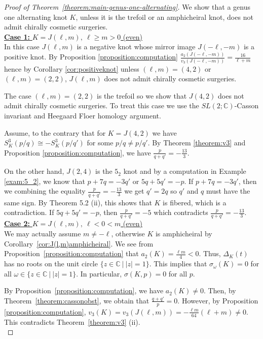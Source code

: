 \documentclass{amsart}
\theoremstyle{remark}
\theoremstyle{definition}
\begin{document}
\begin{proof}[{Proof of Theorem~\ref{theorem:main-genus-one-alternating}}]
We show that a genus one alternating knot $K$, unless it is the trefoil or an amphicheiral knot, does not admit chirally cosmetic surgeries. \\


\underline{\textbf{Case 1:} $K=J(\ell,m), \ \ell \geq m>0$ (even)}\\

In this case $J(\ell,m)$ is a negative knot whose mirror image $J(-\ell,-m)$ is a positive knot. 
By Proposition \ref{proposition:computation} $\frac{a_{2}(J(-\ell,-m))}{v_3(J(-\ell,-m))}= \frac{16}{\ell+m}$ hence by Corollary \ref{cor:positiveknot} unless $(\ell,m)=(4,2)$ or $(\ell,m)=(2,2)$, $J(\ell,m)$ does not admit chirally cosmetic surgeries.

 The case $(\ell,m)=(2,2)$ is the trefoil so we show that $J(4,2)$ does not admit chirally cosmetic surgeries. To treat this case we use the $SL(2;\mathbb{C})$-Casson invariant and Heegaard Floer homology argument.

Assume, to the contrary that for $K=J(4,2)$ we have $S^{3}_K(p/q)\cong -S^{3}_K(p/q')$ for some $p/q\neq p/q'$. By Theorem \ref{theorem:v3} and Proposition \ref{proposition:computation}, we have $\frac{p}{q+q'}=-\frac{13}{3}$.

On the other hand, $J(2,4)$ is the $5_2$ knot and by a computation in Example \ref{exam:5_2}, we know that $p+7q=-3q'$ or $5q+5q'=-p$. If $p+7q=-3q'$, then we combining the equality $\frac{p}{q+q'}=-\frac{13}{3}$ we get $q'=2q$ so $q'$ and $q$ must have the same sign. By Theorem 5.2 (ii), this shows that $K$ is fibered, which is a contradiction. If $5q+5q'=-p$, then $\frac{p}{q+q'}=-5$ which contradicts $\frac{p}{q+q'}=- \frac{13}{3}$.\\


\underline{\textbf{Case 2:} $K=J(\ell,m), \ \ell <0 < m$ (even)}\\

We may actually assume $m \neq -\ell$, otherwise $K$ is amphicheiral by Corollary~\ref{cor:J(l,m)amphicheiral}. 
We see from Proposition~\ref{proposition:computation} that $a_{2}(K) = \frac{\ell m }{4} <0$. 
Thus, $\Delta_{K}(t)$ has no roots on the unit circle $ \{z \in \mathbb{C}\: | \: |z|=1\}$. This implies that $\sigma_{\omega}(K)=0$ for all $\omega \in \{z \in \mathbb{C}\: | \: |z|=1\} $. In particular, $\sigma(K,p)=0$ for all $p$. 

By Proposition~\ref{proposition:computation}, we have $a_2(K) \ne 0$. 
Then, by Theorem~\ref{theorem:cassonobst}, we obtain that $\frac{q+q'}{p}=0$. 
However, by Proposition \ref{proposition:computation}, $v_{3}(K)=v_{3}(J(\ell,m)) = -\frac{\ell m}{64}(\ell +m)\neq 0$. This contradicts Theorem~\ref{theorem:v3} (ii). \\


\end{proof}
\end{document}

